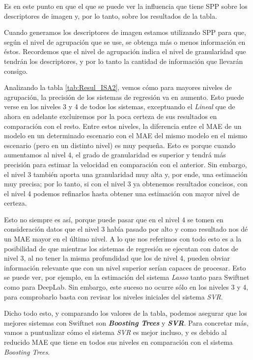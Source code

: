 Es en este punto en que el que se puede ver la influencia que tiene \ac{SPP} sobre los descriptores de imagen y, por lo tanto, sobre los resultados de la tabla.

Cuando generamos los descriptores de imagen estamos utilizando \ac{SPP} para que, según el nivel de agrupación que se use, se obtenga más o menos información en éstos. Recordemos que el nivel de agrupación indica el nivel de granularidad que tendrán los descriptores, y por lo tanto la cantidad de información que llevarán consigo.

Analizando la tabla \ref{tab:Resul_ISA2}, vemos cómo para mayores niveles de agrupación, la precisión de los sistemas de regresión va en aumento. Esto puede verse en los niveles 3 y 4 de todos los sistemas, exceptuando el \textit{Lineal} que de ahora en adelante excluiremos por la poca certeza de sus resultados en comparación con el resto. Entre estos niveles, la diferencia entre el \ac{MAE} de un modelo en un determinado escenario con el \ac{MAE} del mismo modelo en el mismo escenario (pero en un distinto nivel) es muy pequeña. Esto es porque cuando aumentamos al nivel 4, el grado de granularidad es superior y tendrá más precisión para estimar la velocidad en comparación con el anterior. Sin embargo, el nivel 3 también aporta una granularidad muy alta y, por ende, una estimación muy precisa; por lo tanto, si con el nivel 3 ya obtenemos resultados concisos, con el nivel 4 podemos refinarlos hasta obtener una estimación con mayor nivel de certeza.

Esto no siempre es así, porque puede pasar que en el nivel 4 se tomen en consideración datos que el nivel 3 había pasado por alto y como resultado nos dé un \ac{MAE} mayor en el último nivel. A lo que nos referimos con todo esto es a la posibilidad de que mientras los sistemas de regresión se ejecutan con datos de nivel 3, al no tener la misma profundidad que los de nivel 4, pueden obviar información relevante que con un nivel superior serían capaces de procesar. Esto se puede ver, por ejemplo, en la estimación del sistema \textit{Lasso} tanto para Swiftnet como para DeepLab. Sin embargo, este suceso no ocurre sólo en los niveles 3 y 4, para comprobarlo basta con revisar los niveles iniciales del sistema \textit{\ac{SVR}}.

Dicho todo esto, y comparando los valores de la tabla, podemos asegurar que los mejores sistemas con Swiftnet son \textbf{\textit{Boosting Trees}} y \textbf{\textit{\ac{SVR}}}. Para concretar más, vamos a puntualizar cómo el sistema \textit{\ac{SVR}} es mejor incluso, y es debido al reducido \ac{MAE} que tiene en todos sus niveles en comparación con el sistema \textit{Boosting Trees}.

